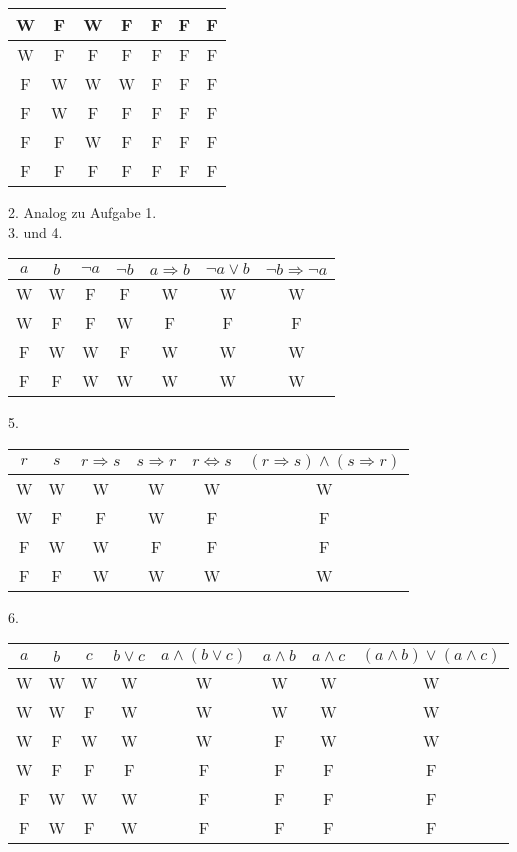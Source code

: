 \documentclass[12pt]{exam}
\begin{document}
\begin{questions}
\begin{solution}
\begin{center}
\begin{tabular}{|c|c|c|c|c|c|c|}
			\hline W&F&W&F&F&F&F\\
			\hline W&F&F&F&F&F&F\\
			\hline F&W&W&W&F&F&F\\
			\hline F&W&F&F&F&F&F\\
			\hline F&F&W&F&F&F&F\\
			\hline F&F&F&F&F&F&F\\
			\hline
		\end{tabular}
	\end{center}
	2. Analog zu Aufgabe 1.\\
	3. und 4.
	\begin{center}
		\begin{tabular}{|c|c|c|c|c|c|c|}
			\hline $a$ & $b$ & $\neg a$ & $\neg b$ & $a\Rightarrow b$ & $\neg a\lor b$ & $\neg b\Rightarrow \neg a$\\
			\hline W&W&F&F&W&W&W\\
			\hline W&F&F&W&F&F&F\\
			\hline F&W&W&F&W&W&W\\
			\hline F&F&W&W&W&W&W\\
			\hline
		\end{tabular}
	\end{center}
	5.
	\begin{center}
		\begin{tabular}{|c|c|c|c|c|c|}
			\hline $r$ & $s$ & $r \Rightarrow s$ & $s\Rightarrow r$ & $r\Leftrightarrow s$ & $(r\Rightarrow s)\land(s\Rightarrow r)$\\
			\hline W&W&W&W&W&W\\
			\hline W&F&F&W&F&F\\
			\hline F&W&W&F&F&F\\
			\hline F&F&W&W&W&W\\
			\hline
		\end{tabular}
	\end{center}
	6.
	\begin{center}
		\begin{tabular}{|c|c|c|c|c|c|c|c|}
			\hline $a$ & $b$ & $c$ & $b\lor c$ & $a\land(b\lor c)$ & $a\land b$ & $a\land c$ & $(a\land b)\lor(a\land c)$\\
			\hline W&W&W&W&W&W&W&W\\
			\hline W&W&F&W&W&W&W&W\\
			\hline W&F&W&W&W&F&W&W\\
			\hline W&F&F&F&F&F&F&F\\
			\hline F&W&W&W&F&F&F&F\\
			\hline F&W&F&W&F&F&F&F\\

\end{tabular}
\end{center}
\end{solution}
\end{questions}
\end{document}
